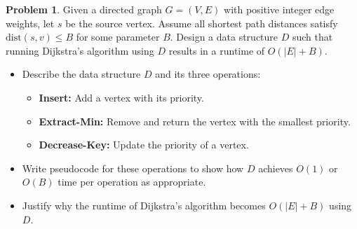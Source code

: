 \documentclass{article}
\theoremstyle{definition}
\newtheorem{problem}{Problem}
\begin{document}
\newpage




\begin{problem}
    Given a directed graph \( G = (V, E) \) with positive integer edge weights, let \( s \) be the source vertex. Assume all shortest path distances satisfy \( \text{dist}(s, v) \leq B \) for some parameter \( B \). Design a data structure \( D \) such that running Dijkstra’s algorithm using \( D \) results in a runtime of \( O(|E| + B) \).


\begin{itemize}
    \item Describe the data structure \( D \) and its three operations:
        \begin{itemize}
            \item \textbf{Insert:} Add a vertex with its priority.
            \item \textbf{Extract-Min:} Remove and return the vertex with the smallest priority.
            \item \textbf{Decrease-Key:} Update the priority of a vertex.
        \end{itemize}
    \item Write pseudocode for these operations to show how \( D \) achieves \( O(1) \) or \( O(B) \) time per operation as appropriate.
    \item Justify why the runtime of Dijkstra’s algorithm becomes \( O(|E| + B) \) using \( D \).
\end{itemize}


\end{problem}
\end{document}
